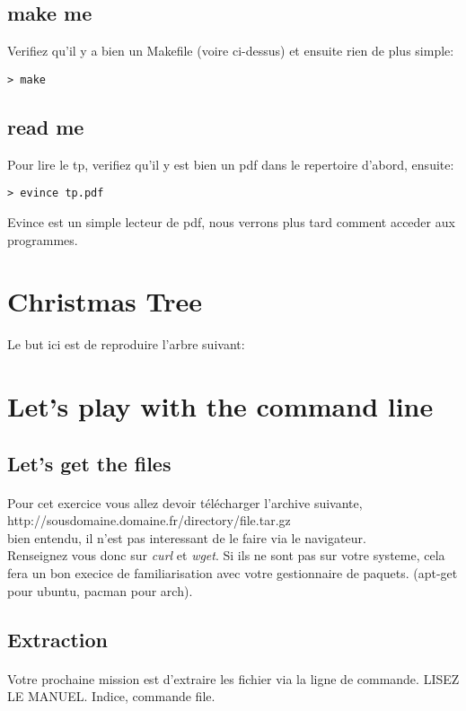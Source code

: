 \documentclass[a4paper]{article}
\begin{document}
\subsection{make me}
Verifiez qu'il y a bien un Makefile (voire ci-dessus) et ensuite rien de plus
simple:
\begin{lstlisting}
> make
\end{lstlisting}
\subsection{read me}
Pour lire le tp, verifiez qu'il y est bien un pdf dans le repertoire d'abord,
ensuite:
\begin{lstlisting}
> evince tp.pdf
\end{lstlisting}
Evince est un simple lecteur de pdf, nous verrons plus tard comment acceder aux
programmes.
\newpage

\section{Christmas Tree}
Le but ici est de reproduire l'arbre suivant:

\section{Let's play with the command line}
\subsection{Let's get the files}
\paragraph{}Pour cet exercice vous allez devoir télécharger l'archive suivante,\\
http://sousdomaine.domaine.fr/directory/file.tar.gz \\ 
bien entendu, il n'est pas interessant de le faire via le navigateur.\\
Renseignez vous donc sur \emph{curl} et \emph{wget}. Si ils ne sont pas sur 
votre systeme, cela fera un bon execice de familiarisation avec votre gestionnaire 
de paquets. (apt-get pour ubuntu, pacman pour arch).

\subsection{Extraction}
\paragraph{}Votre prochaine mission est d'extraire les fichier via la ligne de 
commande. LISEZ LE MANUEL. Indice, commande file.
\end{document}
